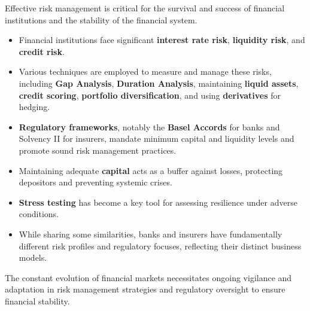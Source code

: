 Effective risk management is critical for the survival and success of financial institutions and the stability of the financial system.
\begin{itemize}
    \item Financial institutions face significant \textbf{interest rate risk}, \textbf{liquidity risk}, and \textbf{credit risk}.
    \item Various techniques are employed to measure and manage these risks, including \textbf{Gap Analysis}, \textbf{Duration Analysis}, maintaining \textbf{liquid assets}, \textbf{credit scoring}, \textbf{portfolio diversification}, and using \textbf{derivatives} for hedging.
    \item \textbf{Regulatory frameworks}, notably the \textbf{Basel Accords} for banks and Solvency II for insurers, mandate minimum capital and liquidity levels and promote sound risk management practices.
    \item Maintaining adequate \textbf{capital} acts as a buffer against losses, protecting depositors and preventing systemic crises.
    \item \textbf{Stress testing} has become a key tool for assessing resilience under adverse conditions.
    \item While sharing some similarities, banks and insurers have fundamentally different risk profiles and regulatory focuses, reflecting their distinct business models.
\end{itemize}
The constant evolution of financial markets necessitates ongoing vigilance and adaptation in risk management strategies and regulatory oversight to ensure financial stability.

